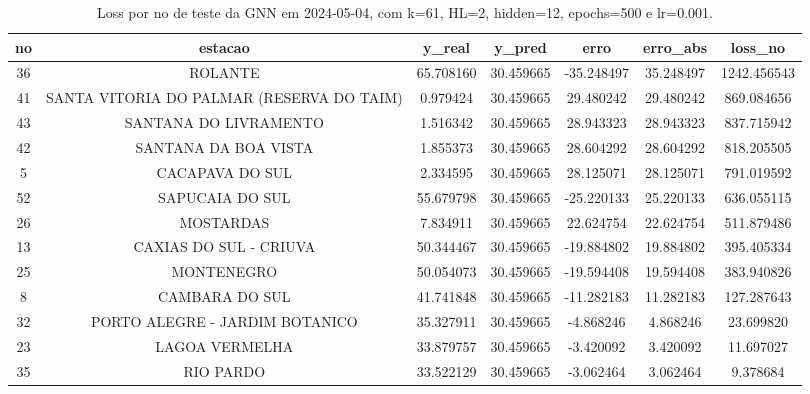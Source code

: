 \begin{table}[h]
\centering
\caption{Loss por no de teste da GNN em 2024-05-04, com k=61, HL=2, hidden=12, epochs=500 e lr=0.001.}
\label{tab:gnn_loss_k61_hl2_h12_e500_d20240504}
\begin{tabular}{ccccccc}
\toprule
no & estacao & y\_real & y\_pred & erro & erro\_abs & loss\_no \\
\midrule
36 & ROLANTE & 65.708160 & 30.459665 & -35.248497 & 35.248497 & 1242.456543 \\
41 & SANTA VITORIA DO PALMAR (RESERVA DO TAIM) & 0.979424 & 30.459665 & 29.480242 & 29.480242 & 869.084656 \\
43 & SANTANA DO LIVRAMENTO & 1.516342 & 30.459665 & 28.943323 & 28.943323 & 837.715942 \\
42 & SANTANA DA BOA VISTA & 1.855373 & 30.459665 & 28.604292 & 28.604292 & 818.205505 \\
5 & CACAPAVA DO SUL & 2.334595 & 30.459665 & 28.125071 & 28.125071 & 791.019592 \\
52 & SAPUCAIA DO SUL & 55.679798 & 30.459665 & -25.220133 & 25.220133 & 636.055115 \\
26 & MOSTARDAS & 7.834911 & 30.459665 & 22.624754 & 22.624754 & 511.879486 \\
13 & CAXIAS DO SUL - CRIUVA & 50.344467 & 30.459665 & -19.884802 & 19.884802 & 395.405334 \\
25 & MONTENEGRO & 50.054073 & 30.459665 & -19.594408 & 19.594408 & 383.940826 \\
8 & CAMBARA DO SUL & 41.741848 & 30.459665 & -11.282183 & 11.282183 & 127.287643 \\
32 & PORTO ALEGRE - JARDIM BOTANICO & 35.327911 & 30.459665 & -4.868246 & 4.868246 & 23.699820 \\
23 & LAGOA VERMELHA & 33.879757 & 30.459665 & -3.420092 & 3.420092 & 11.697027 \\
35 & RIO PARDO & 33.522129 & 30.459665 & -3.062464 & 3.062464 & 9.378684 \\
\bottomrule
\end{tabular}
\end{table}
